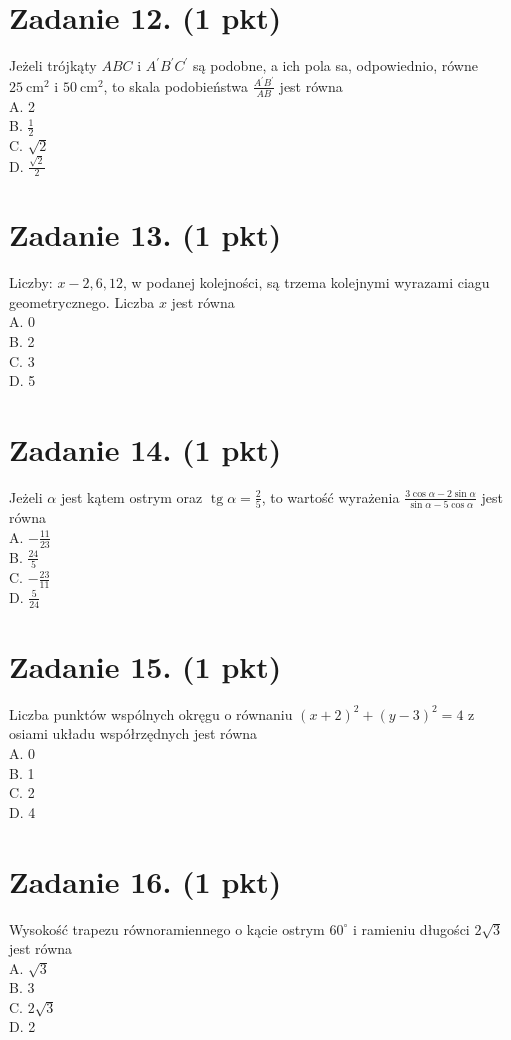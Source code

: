 \documentclass[10pt]{article}
\begin{document}
\section*{Zadanie 12. (1 pkt)}
Jeżeli trójkąty \(A B C\) i \(A^{\prime} B^{\prime} C^{\prime}\) są podobne, a ich pola sa, odpowiednio, równe \(25 \mathrm{~cm}^{2}\) i \(50 \mathrm{~cm}^{2}\), to skala podobieństwa \(\frac{A^{\prime} B^{\prime}}{A B}\) jest równa\\
A. 2\\
B. \(\frac{1}{2}\)\\
C. \(\sqrt{2}\)\\
D. \(\frac{\sqrt{2}}{2}\)

\section*{Zadanie 13. (1 pkt)}
Liczby: \(x-2,6,12\), w podanej kolejności, są trzema kolejnymi wyrazami ciagu geometrycznego. Liczba \(x\) jest równa\\
A. 0\\
B. 2\\
C. 3\\
D. 5

\section*{Zadanie 14. (1 pkt)}
Jeżeli \(\alpha\) jest kątem ostrym oraz \(\operatorname{tg} \alpha=\frac{2}{5}\), to wartość wyrażenia \(\frac{3 \cos \alpha-2 \sin \alpha}{\sin \alpha-5 \cos \alpha}\) jest równa\\
A. \(-\frac{11}{23}\)\\
B. \(\frac{24}{5}\)\\
C. \(-\frac{23}{11}\)\\
D. \(\frac{5}{24}\)

\section*{Zadanie 15. (1 pkt)}
Liczba punktów wspólnych okręgu o równaniu \((x+2)^{2}+(y-3)^{2}=4\) z osiami układu współrzędnych jest równa\\
A. 0\\
B. 1\\
C. 2\\
D. 4

\section*{Zadanie 16. (1 pkt)}
Wysokość trapezu równoramiennego o kącie ostrym \(60^{\circ}\) i ramieniu długości \(2 \sqrt{3}\) jest równa\\
A. \(\sqrt{3}\)\\
B. 3\\
C. \(2 \sqrt{3}\)\\
D. 2
\end{document}
